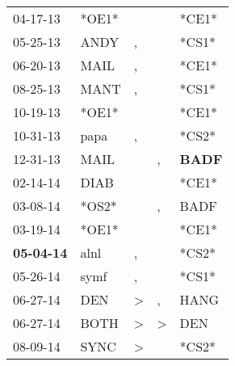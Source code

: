 \begin{supertabular}{p{0.07\textwidth}p{0.06\textwidth}p{0.02\textwidth}p{0.02\textwidth}p{0.06\textwidth}}
          04-17-13\textsuperscript{} &                            *OE1* &                  &               &                            *CE1* \\
          05-25-13\textsuperscript{} &           ANDY\textsuperscript{} &                , &               &                            *CS1* \\
          06-20-13\textsuperscript{} &           MAIL\textsuperscript{} &                , &               &                            *CE1* \\
          08-25-13\textsuperscript{} &           MANT\textsuperscript{} &                , &               &                            *CS1* \\
          10-19-13\textsuperscript{} &                            *OE1* &                  &               &                            *CE1* \\
          10-31-13\textsuperscript{} &           papa\textsuperscript{} &                , &               &                            *CS2* \\
          12-31-13\textsuperscript{} &           MAIL\textsuperscript{} &                  &             , &  \textbf{BADF\textsuperscript{}} \\
          02-14-14\textsuperscript{} &           DIAB\textsuperscript{} &                  &               &                            *CE1* \\
          03-08-14\textsuperscript{} &                            *OS2* &                  &             , &           BADF\textsuperscript{} \\
          03-19-14\textsuperscript{} &                            *OE1* &                  &               &                            *CE1* \\
 \textbf{05-04-14\textsuperscript{}} &           alnl\textsuperscript{} &                , &               &                            *CS2* \\
          05-26-14\textsuperscript{} &           symf\textsuperscript{} &                , &               &                            *CS1* \\
          06-27-14\textsuperscript{} &            DEN\textsuperscript{} &     \textgreater &             , &           HANG\textsuperscript{} \\
          06-27-14\textsuperscript{} &           BOTH\textsuperscript{} &     \textgreater &  \textgreater &            DEN\textsuperscript{} \\
          08-09-14\textsuperscript{} &           SYNC\textsuperscript{} &     \textgreater &               &                            *CS2* \\

\end{supertabular}

